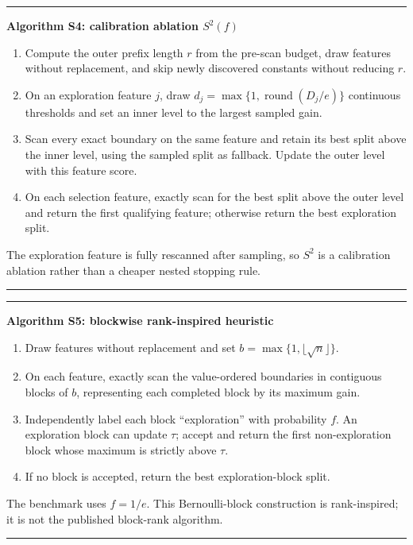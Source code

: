 \documentclass[final,5p,times,twocolumn]{elsarticle}
\newenvironment{suppalgorithm}[1]{%
  \par\medskip\noindent\begin{minipage}{\columnwidth}\small
  \hrule\smallskip\textbf{#1}\par\smallskip
}{%
  \smallskip\hrule\end{minipage}\par\medskip
}
\begin{document}
\begin{suppalgorithm}{Algorithm S4: calibration ablation \(S^2(f)\)}
\begin{enumerate}
\setlength{\itemsep}{0pt}
\item Compute the outer prefix length \(r\) from the pre-scan budget, draw
      features without replacement, and skip newly discovered constants without
      reducing \(r\).
\item On an exploration feature \(j\), draw
      \(d_j=\max\{1,\operatorname{round}(D_j/e)\}\) continuous thresholds and
      set an inner level to the largest sampled gain.
\item Scan every exact boundary on the same feature and retain its best split
      above the inner level, using the sampled split as fallback.  Update the
      outer level with this feature score.
\item On each selection feature, exactly scan for the best split above the
      outer level and return the first qualifying feature; otherwise return the
      best exploration split.
\end{enumerate}
The exploration feature is fully rescanned after sampling, so \(S^2\) is a
calibration ablation rather than a cheaper nested stopping rule.
\end{suppalgorithm}

\begin{suppalgorithm}{Algorithm S5: blockwise rank-inspired heuristic}
\begin{enumerate}
\setlength{\itemsep}{0pt}
\item Draw features without replacement and set
      \(b=\max\{1,\lfloor\sqrt n\rfloor\}\).
\item On each feature, exactly scan the value-ordered boundaries in contiguous
      blocks of \(b\), representing each completed block by its maximum gain.
\item Independently label each block ``exploration'' with probability \(f\).
      An exploration block can update \(\tau\); accept and return the first
      non-exploration block whose maximum is strictly above \(\tau\).
\item If no block is accepted, return the best exploration-block split.
\end{enumerate}
The benchmark uses \(f=1/e\).  This Bernoulli-block construction is
rank-inspired; it is not the published block-rank algorithm.
\end{suppalgorithm}
\end{document}
